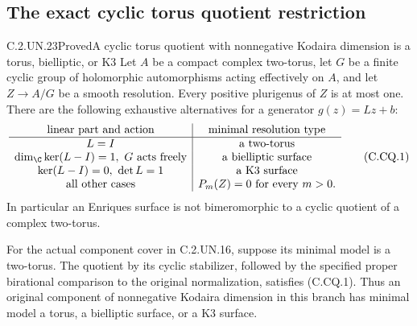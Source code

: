 \subsection{The exact cyclic torus quotient restriction}

\begin{statement}{C.2.UN.23}{Proved}{A cyclic torus quotient with nonnegative Kodaira dimension is a torus, bielliptic, or K3}
Let $A$ be a compact complex two-torus, let $G$ be a finite
cyclic group of holomorphic automorphisms acting effectively
on $A$, and let $Z\to A/G$ be a smooth resolution.
Every positive plurigenus of $Z$ is at most one. There are
the following exhaustive alternatives for a generator
$g(z)=Lz+b$:
\[
\begin{array}{c|c}
\text{linear part and action}&\text{minimal resolution type}\\ \hline
L=I&\text{a two-torus}\\
\dim_{\C}\ker(L-I)=1,\ G\text{ acts freely}
   &\text{a bielliptic surface}\\
\ker(L-I)=0,\ \det L=1&\text{a K3 surface}\\
\text{all other cases}&P_m(Z)=0\text{ for every }m>0 .
\end{array}                                                    \tag{C.CQ.1}
\]
In particular an Enriques surface is not bimeromorphic to
a cyclic quotient of a complex two-torus.

For the actual component cover in C.2.UN.16, suppose its
minimal model is a two-torus. The quotient by its cyclic
stabilizer, followed by the specified proper birational
comparison to the original normalization, satisfies
(C.CQ.1). Thus an original component of nonnegative
Kodaira dimension in this branch has minimal model a
torus, a bielliptic surface, or a K3 surface.
\end{statement}
